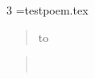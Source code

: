 \documentclass{article}
\newcommand{\inputpoem}[1]{%
  \openin\poemfile=#1
  \noindent\begin{minipage}{\columnwidth}%
  \begin{verse}%
  \loop\unless\ifeof\poemfile
    \read\poemfile to \fileline
    \ifx\fileline\empty
      \end{verse}%
      \end{minipage}%
      \vspace{1em}%
      \par\noindent\begin{minipage}{\columnwidth}%
      \begin{verse}%
    \else
      \fileline \\%
    \fi
  \repeat
  \end{verse}%
  \end{minipage}%
  \closein\poemfile
}
\begin{document}
\begin{multicols}{3}
\inputpoem{testpoem.tex}
\end{multicols}
\end{document}
